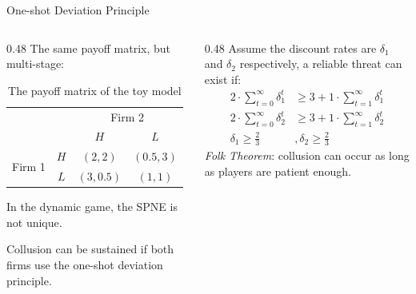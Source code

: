 \documentclass[8pt]{beamer}
\begin{document}
\begin{frame}{One-shot Deviation Principle}
    \begin{columns}
        \begin{column}{0.48\textwidth}
            The same payoff matrix, but multi-stage:
            \begin{table}[htbp]
                \centering
                \caption{The payoff matrix of the toy model}
                \begin{tabular}{cc|c|c}
                    & & \multicolumn{2}{c}{Firm 2} \\
                    & & $H$ & $L$ \\
                    \hline
                    \multirow{2}{*}{Firm 1} & $H$ & $(2,2)$ & $(0.5,3)$ \\
                    \cline{2-4}
                    & $L$ & $(3,0.5)$ & $(1,1)$ \\
                \end{tabular}
            \end{table}
            \vspace{0.5cm}
            In the dynamic game, the SPNE is not unique.
            \vspace{0.5cm}
            
            Collusion can be sustained if both firms use the one-shot deviation principle.
        \end{column}
        \begin{column}{0.48\textwidth}
            Assume the discount rates are $\delta_1$ and $\delta_2$ respectively, a reliable threat can exist if:
            \vspace{0.2cm}
            \[
        	\begin{aligned}
        		2\cdot \sum_{t=0}^\infty\delta_1^t &\ge 3 + 1 \cdot \sum_{t=1}^\infty \delta_1^t \\
        		2\cdot \sum_{t=0}^\infty\delta_2^t &\ge 3 + 1 \cdot \sum_{t=1}^\infty \delta_2^t \\
        		\delta_1 \ge \frac{2}{3} &, \delta_2 \ge \frac{2}{3}
        	\end{aligned}
            \] 
            \vspace{0.2cm}
            \textit{Folk Theorem}: collusion can occur as long as players are patient enough.
        \end{column}
    \end{columns}
\end{frame}
\end{document}
